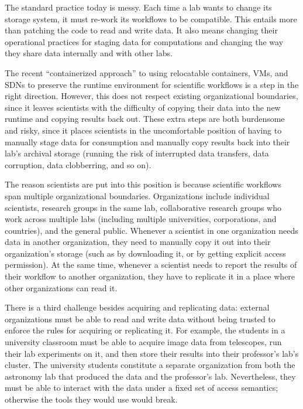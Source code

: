 The standard practice today is messy.  Each time a lab wants to change its
storage system, it must re-work its workflows to be compatible.  This entails
more than patching the code to read and write data.  It also means changing their
operational practices for staging data for computations and changing the way they
share data internally and with other labs.

The recent ``containerized approach'' to using relocatable containers, VMs, and
SDNs to preserve the runtime environment for scientific workflows
is a step in the right direction.  However, this does not respect existing
organizational boundaries, since it leaves scientists with the difficulty of
copying their data into the new runtime and copying results back out.  These
extra steps are both burdensome and risky, since it places scientists in
the uncomfortable position of having to manually stage data for consumption and
manually copy results back into their lab's archival storage (running the risk
of interrupted data transfers, data corruption, data clobberring, and so on).

The reason scientists are put into this position is because scientific workflows
span multiple organizational boundaries.  Organizations include individual
scientists, research groups in the same lab, collaborative research groups who
work across multiple labs (including multiple universities, corporations, and
countries), and the general public.  Whenever a scientist in one organization
needs data in another organization, they need to manually copy it out into their
organization's storage (such as by downloading it, or by getting explicit access
permission).  At the same time, whenever a scientist needs to report the results
of their workflow to another organization, they have to replicate it in a place
where other organizations can read it.

There is a third challenge besides acquiring and replicating data:  external
organizations must be able to read and write data without being trusted to
enforce the rules for acquiring or replicating it.  For example, the students in
a university classroom must be able to acquire image data from telescopes, run
their lab experiments on it, and then store their results into their professor's
lab's cluster.  The university students constitute a separate organization from
both the astronomy lab that produced the data and the professor's lab.
Nevertheless, they must be able to interact with the data under a fixed set of
access semantics; otherwise the tools they would use would break.

